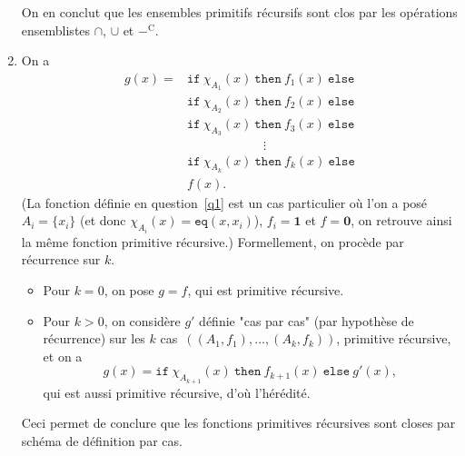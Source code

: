 \documentclass{../../notes}
\begin{document}
\begin{enumerate}
      On en conclut que les ensembles primitifs récursifs sont clos par les opérations ensemblistes $\cap$, $\cup$ et $-^\mathrm{C}$.
    \item On a 
      \begin{align*}
        g(x) = {}&\mathtt{if}\ \chi_{A_1}(x)\ \mathtt{then}\ f_1(x)\ \mathtt{else}\\
               &\mathtt{if}\ \chi_{A_2}(x)\ \mathtt{then}\ f_2(x)\ \mathtt{else}\\
               &\mathtt{if}\ \chi_{A_3}(x)\ \mathtt{then}\ f_3(x)\ \mathtt{else}\\
               & \qquad \qquad \qquad \vdots \\
               &\mathtt{if}\ \chi_{A_k}(x)\ \mathtt{then}\ f_k(x)\ \mathtt{else}\\
               & f(x)
      .\end{align*}
      (La fonction définie en question~\ref{q1} est un cas particulier où l'on a posé~$A_i = \{x_i\}$ (et donc $\chi_{A_i}(x) = \mathtt{eq}(x,x_i)$), $f_i = \mathbf{1}$ et $f = \mathbf{0}$, on retrouve ainsi la même fonction primitive récursive.)
      Formellement, on procède par récurrence sur $k$.
      \begin{itemize}
        \item Pour $k = 0$, on pose $g = f$, qui est primitive récursive.
        \item Pour $k > 0$, on considère $g'$ définie "cas par cas" (par hypothèse de récurrence) sur les $k$ cas~$((A_1, f_1), \ldots, (A_k, f_k))$, primitive récursive, et on a \[
          g(x) = \mathtt{if}\ \chi_{A_{k+1}}(x)\ \mathtt{then}\ f_{k+1}(x)\ \mathtt{else}\ g'(x)
          ,\]
          qui est aussi primitive récursive, d'où l'hérédité.
      \end{itemize}
      Ceci permet de conclure que les fonctions primitives récursives sont closes par schéma de définition par cas.
  \end{enumerate}
\end{document}
